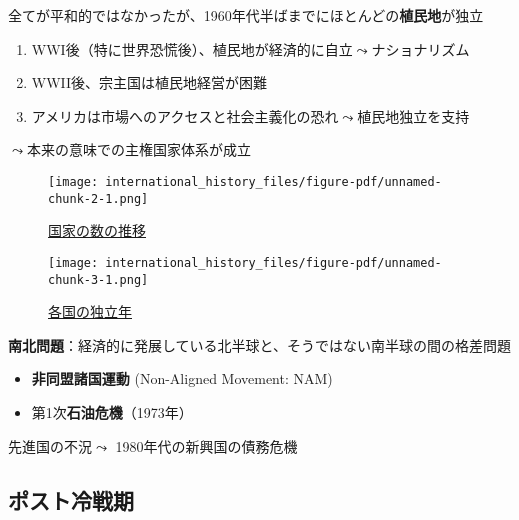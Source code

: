 \documentclass[
  xelatex,
  ja=standard]{bxjsarticle}
\providecommand{\tightlist}{%
  \setlength{\itemsep}{0pt}\setlength{\parskip}{0pt}}\usepackage{longtable,booktabs,array}
\begin{document}
全てが平和的ではなかったが、1960年代半ばまでにほとんどの\textbf{植民地}が独立

\begin{enumerate}
\def\labelenumi{\arabic{enumi}.}
\tightlist
\item
  WWI後（特に世界恐慌後）、植民地が経済的に自立\(\leadsto\)ナショナリズム
\item
  WWII後、宗主国は植民地経営が困難
\item
  アメリカは市場へのアクセスと社会主義化の恐れ\(\leadsto\)植民地独立を支持
\end{enumerate}

\(\leadsto\)本来の意味での主権国家体系が成立

\begin{figure}[htpb]

{\centering \texttt{[image: international\_history\_files/figure-pdf/unnamed-chunk-2-1.png]}

}

\caption{\href{https://correlatesofwar.org/data-sets/state-system-membership/}{国家の数の推移}}

\end{figure}

\begin{figure}[htpb]

{\centering \texttt{[image: international\_history\_files/figure-pdf/unnamed-chunk-3-1.png]}

}

\caption{\href{https://correlatesofwar.org/data-sets/state-system-membership/}{各国の独立年}}

\end{figure}

\textbf{南北問題}：経済的に発展している北半球と、そうではない南半球の間の格差問題

\begin{itemize}
\tightlist
\item
  \textbf{非同盟諸国運動} (Non-Aligned Movement: NAM)
\item
  第1次\textbf{石油危機}（1973年）
\end{itemize}

先進国の不況\(\leadsto\) 1980年代の新興国の債務危機

\hypertarget{ux30ddux30b9ux30c8ux51b7ux6226ux671f}{%
\subsection{ポスト冷戦期}\label{ux30ddux30b9ux30c8ux51b7ux6226ux671f}}
\end{document}
